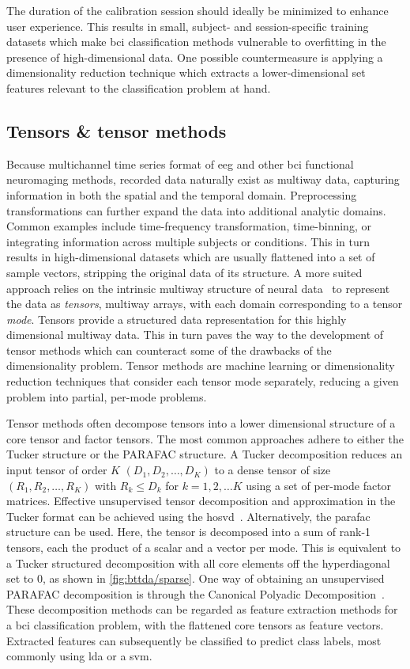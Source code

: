 \documentclass[twocolumn]{article}
\begin{document}
The duration of the calibration session should ideally be minimized to enhance
user experience.
This results in small, subject- and session-specific training datasets
which make \ac{bci} classification methods vulnerable to overfitting in the
presence of high-dimensional data.
One possible countermeasure is applying a dimensionality reduction technique
which extracts a lower-dimensional set features relevant to the classification
problem at hand.

\subsection{Tensors \& tensor methods}

Because multichannel time series format of \ac{eeg} and other \ac{bci} functional
neuromaging methods, recorded data naturally exist as multiway data, capturing
information in both the spatial and the temporal domain.
Preprocessing transformations can further expand the data into additional
analytic domains.
Common examples include time-frequency transformation, time-binning, or
integrating information across multiple subjects or conditions.
This in turn results in high-dimensional datasets which are usually flattened
into a set of sample vectors, stripping the original data of its structure.
A more suited approach relies on the intrinsic multiway structure of neural
data~\cite{Erol2022} to represent the data as \emph{tensors}, multiway arrays,
with each domain corresponding to a tensor \emph{mode}.
Tensors provide a structured data representation for this highly dimensional
multiway data.
This in turn paves the way to the development of tensor methods which can
counteract some of the drawbacks of the dimensionality problem.
Tensor methods are machine learning or dimensionality reduction techniques that
consider each tensor mode separately, reducing a given problem into partial,
per-mode problems.

Tensor methods often decompose tensors into a lower dimensional structure
of a core tensor and factor tensors.
The most common approaches adhere to either the Tucker structure or the PARAFAC
structure.
A Tucker decomposition reduces an input tensor of order $K$  $(D_1,D_2,\ldots,D_K)$ to
a dense tensor of size $(R_1,R_2,\ldots,R_K)$ with $R_k \leq D_k$ for $k=1, 2, \ldots K$ using a
set of per-mode factor matrices.
Effective unsupervised tensor decomposition and approximation in the Tucker format can be achieved
using the \ac{hosvd}~\cite{DeLathauwer2000,SoleCasals2018}.
Alternatively, the \ac{parafac} structure can be used.
Here, the tensor is decomposed into a sum of rank-1 tensors, each the product
of a scalar and a vector per mode.
This is equivalent to a Tucker structured decomposition with all core elements
off the hyperdiagonal set to 0, as shown in \cref{fig:bttda/sparse}.
One way of obtaining an unsupervised PARAFAC decomposition is through the Canonical Polyadic
Decomposition~\cite{Hitchcock1927,Nazarpour2006}.
These decomposition methods can be regarded as feature extraction methods for a
\ac{bci} classification problem, with the flattened core tensors as feature vectors.
Extracted features can subsequently be classified to predict class labels, most
commonly using \ac{lda} or a \ac{svm}.
\end{document}
